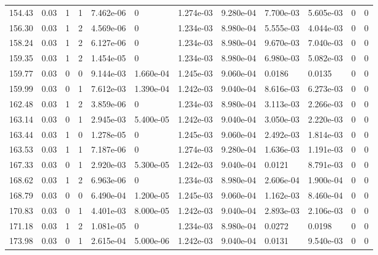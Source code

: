 \documentclass[preview]{standalone}
\begin{document}
{{{\begin{tabular}{L{1.2cm}C{1.2cm} C{0.3cm}C{0.5cm} C{1.4cm}C{1.4cm} C{1.4cm}C{1.4cm} C{1.6cm}C{1.6cm} C{1.6cm}C{1.6cm}}
  154.43  &  0.03  & 1     &  1 &  7.462e-06  & 0  &  1.274e-03&   9.280e-04& 7.700e-03 & 5.605e-03   &  0 & 0  \\ 
  156.30  &  0.03  & 1     &  2 &  4.569e-06  & 0  &  1.234e-03&   8.980e-04& 5.555e-03 & 4.044e-03   &  0 & 0  \\ 
  158.24  &  0.03  & 1     &  2 &  6.127e-06  & 0  &  1.234e-03&   8.980e-04& 9.670e-03 & 7.040e-03   &  0 & 0  \\ 
  159.35  &  0.03  & 1     &  2 &  1.454e-05  & 0  &  1.234e-03&   8.980e-04& 6.980e-03 & 5.082e-03   &  0 & 0  \\ 
  159.77  &  0.03  & 0     &  0 &  9.144e-03  & 1.660e-04  &  1.245e-03&   9.060e-04& 0.0186 & 0.0135   &  0 & 0  \\ 
  159.99  &  0.03  & 0     &  1 &  7.612e-03  & 1.390e-04  &  1.242e-03&   9.040e-04& 8.616e-03 & 6.273e-03   &  0 & 0  \\ 
  162.48  &  0.03  & 1     &  2 &  3.859e-06  & 0  &  1.234e-03&   8.980e-04& 3.113e-03 & 2.266e-03   &  0 & 0  \\ 
  163.14  &  0.03  & 0     &  1 &  2.945e-03  & 5.400e-05  &  1.242e-03&   9.040e-04& 3.050e-03 & 2.220e-03   &  0 & 0  \\ 
  163.44  &  0.03  & 1     &  0 &  1.278e-05  & 0  &  1.245e-03&   9.060e-04& 2.492e-03 & 1.814e-03   &  0 & 0  \\ 
  163.53  &  0.03  & 1     &  1 &  7.187e-06  & 0  &  1.274e-03&   9.280e-04& 1.636e-03 & 1.191e-03   &  0 & 0  \\ 
  167.33  &  0.03  & 0     &  1 &  2.920e-03  & 5.300e-05  &  1.242e-03&   9.040e-04& 0.0121 & 8.791e-03   &  0 & 0  \\ 
  168.62  &  0.03  & 1     &  2 &  6.963e-06  & 0  &  1.234e-03&   8.980e-04& 2.606e-04 & 1.900e-04   &  0 & 0  \\ 
  168.79  &  0.03  & 0     &  0 &  6.490e-04  & 1.200e-05  &  1.245e-03&   9.060e-04& 1.162e-03 & 8.460e-04   &  0 & 0  \\ 
  170.83  &  0.03  & 0     &  1 &  4.401e-03  & 8.000e-05  &  1.242e-03&   9.040e-04& 2.893e-03 & 2.106e-03   &  0 & 0  \\ 
  171.18  &  0.03  & 1     &  2 &  1.081e-05  & 0  &  1.234e-03&   8.980e-04& 0.0272 & 0.0198   &  0 & 0  \\ 
  173.98  &  0.03  & 0     &  1 &  2.615e-04  & 5.000e-06  &  1.242e-03&   9.040e-04& 0.0131 & 9.540e-03   &  0 & 0  \\ 
\hline 
\end{tabular} 

}}}
\end{document}
